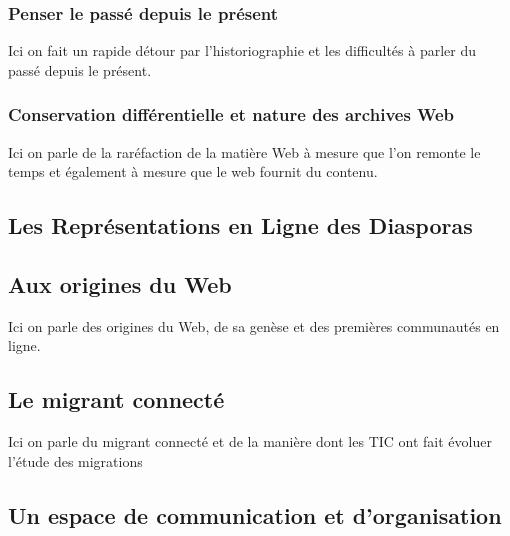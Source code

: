 \documentclass[symmetric,justified,marginals=raggedouter]{tufte-book}
\begin{document}
\subsection{Penser le passé depuis le présent}

\noindent Ici on fait un rapide détour par l'historiographie et les difficultés à parler du passé depuis le présent.

\subsection{Conservation différentielle et nature des archives Web}

\noindent Ici on parle de la raréfaction de la matière Web à mesure que l'on remonte le temps et également à mesure que le web fournit du contenu.



\cleardoublepage
\begin{minipage}[t,leftmargin=5em]{1.5\linewidth}%
\begin{adjustwidth}{-0.5cm}{}
\chapter{Les Représentations en Ligne des Diasporas} 
\label{chap:2}
\end{adjustwidth}
\end{minipage}
\hfill

\section{Aux origines du Web}
\label{sec:2_web}

\noindent Ici on parle des origines du Web, de sa genèse et des premières communautés en ligne.

\section{Le migrant connecté}
\label{sec:2_migrant_connecte}

\noindent Ici on parle du migrant connecté et de la manière dont les TIC ont fait évoluer l'étude des migrations

\section{Un espace de communication et d'organisation}
\label{sec:2_espace}
\end{document}
